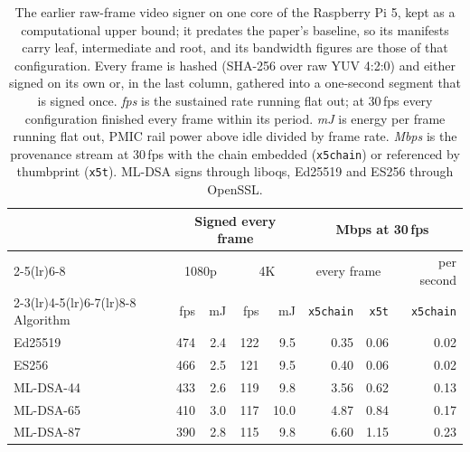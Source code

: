 \begin{table}[t]
\caption{The earlier raw-frame video signer on one core of the Raspberry Pi 5, kept as a computational upper bound; it predates the paper's baseline, so its manifests carry leaf, intermediate and root, and its bandwidth figures are those of that configuration. Every frame is hashed (SHA-256 over raw YUV 4:2:0) and either signed on its own or, in the last column, gathered into a one-second segment that is signed once. \emph{fps} is the sustained rate running flat out; at 30\,fps every configuration finished every frame within its period. \emph{mJ} is energy per frame running flat out, PMIC rail power above idle divided by frame rate. \emph{Mbps} is the provenance stream at 30\,fps with the chain embedded (\texttt{x5chain}) or referenced by thumbprint (\texttt{x5t}). ML-DSA signs through liboqs, Ed25519 and ES256 through OpenSSL.}
\label{tab:video}
\small
\begin{tabular}{lrrrrrrr}
\toprule
 & \multicolumn{4}{c}{Signed every frame} & \multicolumn{3}{c}{Mbps at 30\,fps}\\
\cmidrule(lr){2-5}\cmidrule(lr){6-8}
 & \multicolumn{2}{c}{1080p} & \multicolumn{2}{c}{4K} & \multicolumn{2}{c}{every frame} & per second\\
\cmidrule(lr){2-3}\cmidrule(lr){4-5}\cmidrule(lr){6-7}\cmidrule(lr){8-8}
Algorithm & fps & mJ & fps & mJ & \texttt{x5chain} & \texttt{x5t} & \texttt{x5chain}\\
\midrule
Ed25519 & 474 & 2.4 & 122 & 9.5 & 0.35 & 0.06 & 0.02\\
ES256 & 466 & 2.5 & 121 & 9.5 & 0.40 & 0.06 & 0.02\\
ML-DSA-44 & 433 & 2.6 & 119 & 9.8 & 3.56 & 0.62 & 0.13\\
ML-DSA-65 & 410 & 3.0 & 117 & 10.0 & 4.87 & 0.84 & 0.17\\
ML-DSA-87 & 390 & 2.8 & 115 & 9.8 & 6.60 & 1.15 & 0.23\\
\bottomrule
\end{tabular}
\end{table}
